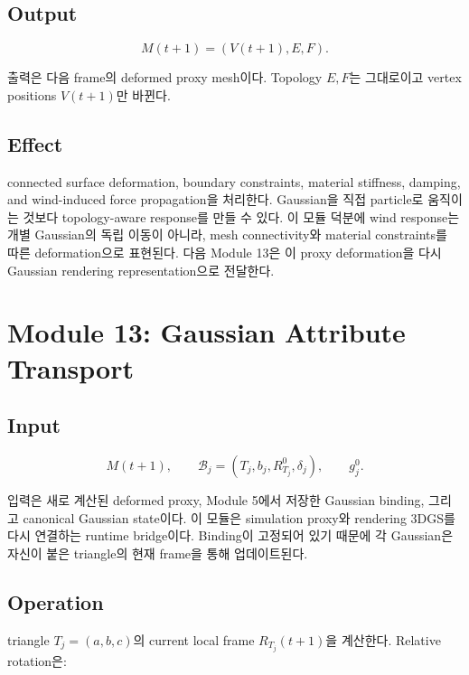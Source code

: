 \documentclass[11pt,a4paper]{article}
\begin{document}
\subsection*{Output}

\begin{equation}
M(t+1)=(V(t+1),E,F).
\end{equation}

출력은 다음 frame의 deformed proxy mesh이다.
Topology $E,F$는 그대로이고 vertex positions $V(t+1)$만 바뀐다.

\subsection*{Effect}

connected surface deformation, boundary constraints, material stiffness, damping, and wind-induced force propagation을 처리한다. Gaussian을 직접 particle로 움직이는 것보다 topology-aware response를 만들 수 있다.
이 모듈 덕분에 wind response는 개별 Gaussian의 독립 이동이 아니라, mesh connectivity와 material constraints를 따른 deformation으로 표현된다.
다음 Module 13은 이 proxy deformation을 다시 Gaussian rendering representation으로 전달한다.

\section{Module 13: Gaussian Attribute Transport}

\subsection*{Input}

\begin{equation}
M(t+1),\qquad \mathcal{B}_j=(T_j,b_j,R_{T_j}^0,\delta_j),\qquad g_j^0.
\end{equation}

입력은 새로 계산된 deformed proxy, Module 5에서 저장한 Gaussian binding, 그리고 canonical Gaussian state이다.
이 모듈은 simulation proxy와 rendering 3DGS를 다시 연결하는 runtime bridge이다.
Binding이 고정되어 있기 때문에 각 Gaussian은 자신이 붙은 triangle의 현재 frame을 통해 업데이트된다.

\subsection*{Operation}

triangle $T_j=(a,b,c)$의 current local frame $R_{T_j}(t+1)$을 계산한다. Relative rotation은:
\end{document}
